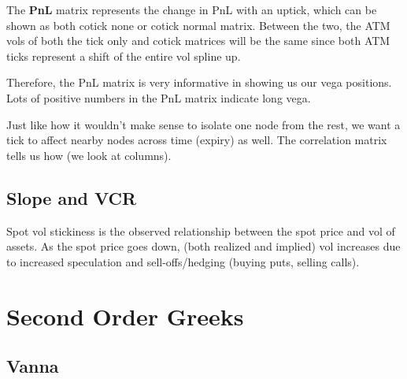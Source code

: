 \documentclass{article}
\begin{document}
    \begin{definition}
      The \textbf{PnL} matrix represents the change in PnL with an uptick, which can be shown as both cotick none or cotick normal matrix.  
      Between the two, the ATM vols of both the tick only and cotick matrices will be the same since both ATM ticks represent a shift of the entire vol spline up. 
    \end{definition}

    Therefore, the PnL matrix is very informative in showing us our vega positions. Lots of positive numbers in the PnL matrix indicate long vega. 

    \begin{definition}
      Just like how it wouldn't make sense to isolate one node from the rest, we want a tick to affect nearby nodes across time (expiry) as well. The correlation matrix tells us how (we look at columns). 
    \end{definition}

  \subsection{Slope and VCR}

    Spot vol stickiness is the observed relationship between the spot price and vol of assets. As the spot price goes down, (both realized and implied) vol increases due to increased speculation and sell-offs/hedging (buying puts, selling calls).

\section{Second Order Greeks}

  \subsection{Vanna}
\end{document}
